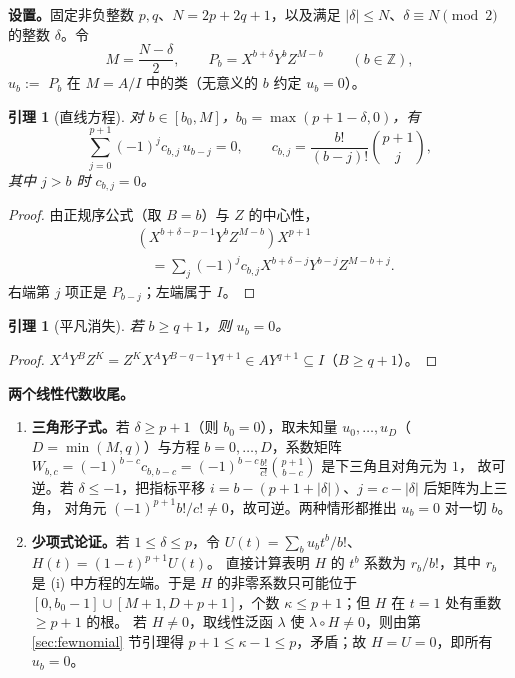 \documentclass[11pt,UTF8]{ctexart}
\newtheorem{lemma}[theorem]{引理}
\theoremstyle{definition}
\newcommand{\Z}{\mathbb{Z}}
\begin{document}
\noindent\textbf{设置。}固定非负整数 $p,q$、$N=2p+2q+1$，以及满足
$|\delta|\le N$、$\delta\equiv N\pmod2$ 的整数 $\delta$。令
\[
M=\frac{N-\delta}{2},\qquad P_b=X^{b+\delta}Y^{b}Z^{M-b}\qquad(b\in\Z),
\]
$u_b:=$ $P_b$ 在 $M=A/I$ 中的类（无意义的 $b$ 约定 $u_b=0$）。

\begin{lemma}[直线方程]\label{lem:line-eq}
对 $b\in[b_0,M]$，$b_0=\max(p+1-\delta,0)$，有
\[
\sum_{j=0}^{p+1}(-1)^{j}c_{b,j}\,u_{b-j}=0,\qquad c_{b,j}=\frac{b!}{(b-j)!}\binom{p+1}{j},
\]
其中 $j>b$ 时 $c_{b,j}=0$。
\end{lemma}

\begin{proof}
由正规序公式（取 $B=b$）与 $Z$ 的中心性，
\[
\begin{aligned}
&(X^{b+\delta-p-1}Y^{b}Z^{M-b})X^{p+1}\\
&\quad=\sum_j(-1)^jc_{b,j}X^{b+\delta-j}Y^{b-j}Z^{M-b+j}.
\end{aligned}
\]
右端第 $j$ 项正是 $P_{b-j}$；左端属于 $I$。
\end{proof}

\begin{lemma}[平凡消失]\label{lem:triv2}
若 $b\ge q+1$，则 $u_b=0$。
\end{lemma}

\begin{proof}
$X^{A}Y^{B}Z^{K}=Z^{K}X^{A}Y^{B-q-1}Y^{q+1}\in AY^{q+1}\subseteq I$（$B\ge q+1$）。
\end{proof}

\noindent\textbf{两个线性代数收尾。}
\begin{enumerate}[label=(\roman*)]
\item \textbf{三角形子式。}若 $\delta\ge p+1$（则 $b_0=0$），取未知量 $u_0,\dots,u_D$（$D=\min(M,q)$）与方程
$b=0,\dots,D$，系数矩阵 $W_{b,c}=(-1)^{b-c}c_{b,b-c}=(-1)^{b-c}\frac{b!}{c!}\binom{p+1}{b-c}$ 是下三角且对角元为 $1$，
故可逆。若 $\delta\le-1$，把指标平移 $i=b-(p+1+|\delta|)$、$j=c-|\delta|$ 后矩阵为上三角，
对角元 $(-1)^{p+1}b!/c!\ne0$，故可逆。两种情形都推出 $u_b=0$ 对一切 $b$。
\item \textbf{少项式论证。}若 $1\le\delta\le p$，令 $U(t)=\sum_b u_bt^{b}/b!$、$H(t)=(1-t)^{p+1}U(t)$。
直接计算表明 $H$ 的 $t^{b}$ 系数为 $r_b/b!$，其中 $r_b$ 是 (i) 中方程的左端。于是 $H$ 的非零系数只可能位于
$[0,b_0-1]\cup[M+1,D+p+1]$，个数 $\kappa\le p+1$；但 $H$ 在 $t=1$ 处有重数 $\ge p+1$ 的根。
若 $H\ne0$，取线性泛函 $\lambda$ 使 $\lambda\circ H\ne0$，则由第 \ref{sec:fewnomial} 节引理得
$p+1\le\kappa-1\le p$，矛盾；故 $H=U=0$，即所有 $u_b=0$。
\end{enumerate}
\end{document}
